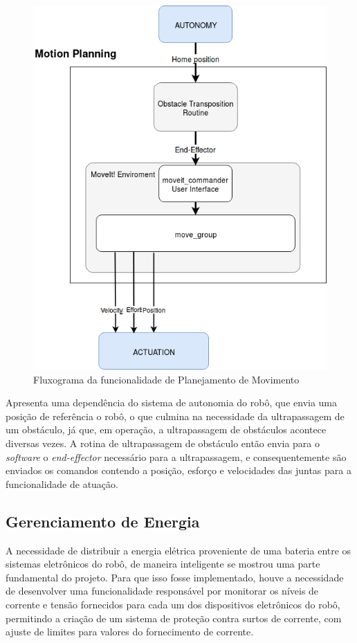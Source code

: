 \begin{figure}[H]
	\centering
	\includegraphics[scale=0.4]{Figures/motion_plan_func.png}
	\caption{Fluxograma da funcionalidade de Planejamento de Movimento}
	\label{fig:fluxo_motion}
\end{figure}

		
Apresenta uma dependência do sistema de autonomia do robô, que envia uma posição de referência o robô, o que culmina na necessidade da ultrapassagem de um obstáculo, já que, em operação, a ultrapassagem de obstáculos acontece diversas vezes. A rotina de ultrapassagem de obstáculo então envia para o \textit{software} o \textit{end-effector} necessário para a ultrapassagem, e consequentemente são enviados os comandos contendo  a posição, esforço e velocidades das juntas para a funcionalidade de atuação.

\subsection{Gerenciamento de Energia}\label{sec:geren_ener} 
A necessidade de distribuir a energia elétrica proveniente de uma bateria entre os sistemas eletrônicos do robô, de maneira inteligente se mostrou uma parte fundamental do projeto. Para que isso fosse implementado, houve a necessidade de desenvolver uma funcionalidade responsável por monitorar os níveis de corrente e tensão fornecidos para cada um dos dispositivos eletrônicos do robô, permitindo a criação de um sistema de proteção contra surtos de corrente, com ajuste de limites para valores do fornecimento de corrente.

